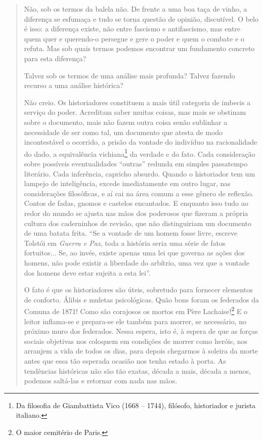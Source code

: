 \begin{quote}
Não, sob os termos da balela não. De frente a uma boa taça de vinho, a
diferença se esfumaça e tudo se torna questão de opinião, discutível. O
belo é isso: a diferença existe, não entre fascismo e antifascismo, mas
entre quem quer e querendo-o persegue e gere o poder e quem o combate e
o refuta. Mas sob quais termos podemos encontrar um fundamento concreto
para esta diferença?

Talvez sob os termos de uma análise mais profunda? Talvez fazendo
recurso a uma análise histórica?

Não creio. Os historiadores constituem a mais útil categoria de imbecis
a serviço do poder. Acreditam saber muitas coisas, mas mais se obstinam
sobre o documento, mais não fazem outra coisa senão sublinhar a
necessidade de ser como tal, um documento que atesta de modo
incontestável o ocorrido, a prisão da vontade do indivíduo na
racionalidade do dado, a equivalência vichiana\footnote{Da filosofia de Giambattista Vico (1668 -- 1744), filósofo,
  historiador e jurista italiano.} da verdade e do fato. Cada consideração sobre possíveis
eventualidades ``outras'' redunda em simples passatempo literário. Cada
inferência, capricho absurdo. Quando o historiador tem um lampejo de
inteligência, excede imediatamente em outro lugar, nas considerações
filosóficas, e aí cai na área comum a esse gênero de reflexão. Contos de
fadas, gnomos e castelos encantados. E enquanto isso tudo ao redor do
mundo se ajusta nas mãos dos poderosos que fizeram a própria cultura dos
caderninhos de revisão, que não distinguiriam um documento de uma batata
frita. ``Se a vontade de um homem fosse livre, escreve Tolstói em
\emph{Guerra e Paz}, toda a história seria uma série de fatos
fortuitos... Se, ao invés, existe apenas uma lei que governa as ações
dos homens, não pode existir a liberdade do arbítrio, uma vez que a
vontade dos homens deve estar sujeita a esta lei''.

O fato é que os historiadores são úteis, sobretudo para fornecer
elementos de conforto. Álibis e muletas psicológicas. Quão bons foram os
federados da Comuna de 1871! Como são corajosos os mortos em Père
Lachaise!\footnote{O maior cemitério de Paris.} E o leitor inflama-se e prepara-se ele também para
morrer, se necessário, no próximo muro dos federados. Nessa espera, isto
é, à espera de que as forças sociais objetivas nos coloquem em condições
de morrer como heróis, nos arranjem a vida de todos os dias, para depois
chegarmos à soleira da morte antes que essa tão esperada ocasião nos
tenha estado à porta. As tendências históricas não são tão exatas,
década a mais, década a menos, podemos saltá-las e retornar com nada nas
mãos.


\end{quote}
